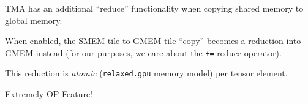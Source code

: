\begin{minipage}[t]{0.5\textwidth}\fixminipage
TMA has an additional ``reduce'' functionality when copying shared memory to global memory.

When enabled, the SMEM tile to GMEM tile ``copy'' becomes a reduction into GMEM instead (for our purposes, we care about the \texttt{+=} reduce operator).

This reduction is \textit{atomic} (\texttt{relaxed.gpu} memory model) per tensor element.

Extremely OP Feature!

\end{minipage}
\hfill
\begin{minipage}[t]{0.5\textwidth}\fixminipage
\end{minipage}







